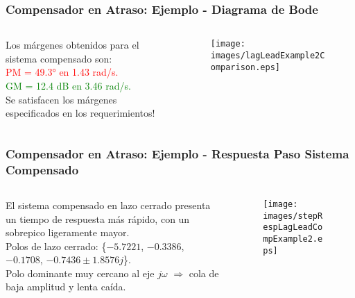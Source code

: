 \documentclass[aspectratio=169, handout]{beamer}
\theoremstyle{definition}
\theoremstyle{plain}
\theoremstyle{remark}
\begin{document}
\begin{frame}[<+->]\frametitle{Compensador en Atraso: Ejemplo - Diagrama de Bode}
\begin{columns}
	\begin{column}{0.35\textwidth}
		\small
		Los márgenes obtenidos para el sistema compensado son:\\
		\vspace*{2mm}
		\pause
		\textcolor{red}{PM = \ang{49.3} en 1.43 rad/s.}\\
		\vspace*{2mm}
		\pause
		\textcolor{green}{GM = 12.4 dB en 3.46 rad/s.}\\
		\vspace*{2mm}
		\pause
		Se satisfacen los márgenes especificados en los requerimientos!
	\end{column}
	\begin{column}{0.65\textwidth}
		\begin{figure}
			\centering
			\texttt{[image: images/lagLeadExample2Comparison.eps]}
		\end{figure}
	\end{column}
\end{columns}
\end{frame}

\begin{frame}[<+->]\frametitle{Compensador en Atraso: Ejemplo - Respuesta Paso Sistema Compensado}
\begin{columns}
	\begin{column}{0.3\textwidth}
		\small
		El sistema compensado en lazo cerrado presenta un tiempo de respuesta más rápido, con un sobrepico ligeramente mayor.\\
		\vspace*{2mm}
		\pause
		Polos de lazo cerrado: \scriptsize \{$-5.7221$, $-0.3386$, $-0.1708$, $-0.7436 \pm 1.8576j$\}.\\ 
		\vspace*{2mm}
		\pause
		\small Polo dominante muy cercano al eje $j\omega$ $\Rightarrow$ cola de baja amplitud y lenta caída.
	\end{column}
	\begin{column}{0.7\textwidth}
		\begin{figure}
			\centering
			\texttt{[image: images/stepRespLagLeadCompExample2.eps]}
		\end{figure}
	\end{column}
\end{columns}
\end{frame}
\end{document}
